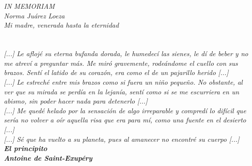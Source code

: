 \chapter*{}
\chapter*{}
\vspace{2cm}
\begin{flushright}
\large	\textit{IN MEMORIAM}\\
	\textit{Norma Juárez Loeza}\\
	\textit{Mi madre, venerada hasta la eternidad}\\
\end{flushright}
\chapter*{}
\begin{flushright}
	\textit{[...] Le aflojé su eterna bufanda dorada, le humedecí las sienes, le dí de beber y no me atreví a preguntar más. Me miró gravemente, rodeándome el cuello con sus brazos. Sentí el latido de su corazón, era como el de un pajarillo herido [...]}\\
\vspace{1cm}
	\textit{ [...] Le estreché entre mis brazos como si fuera un niño pequeño. No obstante, al ver que su mirada se perdía en la lejanía, sentí como si se me escurriera en un abismo, sin poder hacer nada para detenerlo [...]}\\
\vspace{1cm}
	\textit{[...] Me quedé helado por la sensación de algo irreparable y compredí lo difícil que sería no volver a oír aquella risa que era para mí, como una fuente en el desierto [...]}\\
\vspace{1cm}
	\textit{[...] Sé que ha vuelto a su planeta, pues al amanecer no encontré su cuerpo [...]}\\
\vspace{1cm}
	\textbf{\textit{El principito}\\
	\textit{Antoine de Saint-Exupéry}}\\
\end{flushright}

